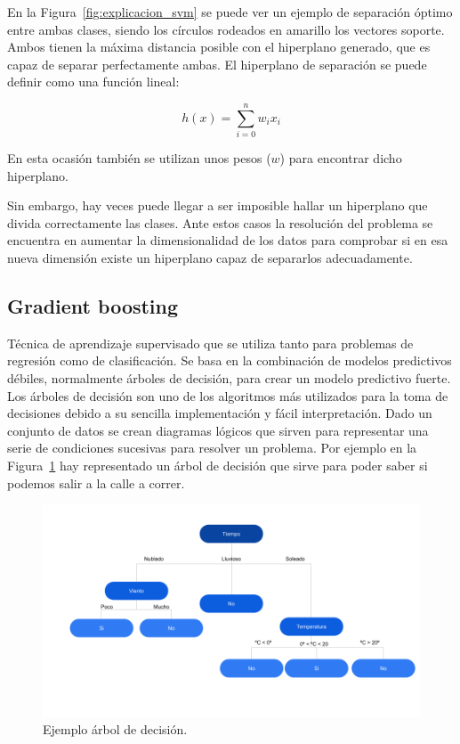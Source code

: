 \documentclass[a4paper, 12pt]{book}
\begin{document}
En la Figura~\ref{fig:explicacion_svm} se puede ver un ejemplo de separación óptimo entre ambas clases, siendo los círculos rodeados en amarillo los vectores soporte. Ambos tienen la máxima distancia posible con el hiperplano generado, que es capaz de separar perfectamente ambas. El hiperplano de separación se puede definir como una función lineal:

\begin{equation}
    h(x) = \sum_{i= 0}^{n} w_i x_i
\end{equation}

En esta ocasión también se utilizan unos pesos ($w$) para encontrar dicho hiperplano.

Sin embargo, hay veces puede llegar a ser imposible hallar un hiperplano que divida correctamente las clases. Ante estos casos la resolución del problema se encuentra en aumentar la dimensionalidad de los datos para comprobar si en esa nueva dimensión existe un hiperplano capaz de separarlos adecuadamente.


\subsection{Gradient boosting}
\label{subsec:gradient_boosting}

Técnica de aprendizaje supervisado que se utiliza tanto para problemas de regresión como de clasificación. Se basa en la combinación de modelos predictivos débiles, normalmente árboles de decisión, para crear un modelo predictivo fuerte. Los árboles de decisión son uno de los algoritmos más utilizados para la toma de decisiones debido a su sencilla implementación y fácil interpretación. Dado un conjunto de datos se crean diagramas lógicos que sirven para representar una serie de condiciones sucesivas para resolver un problema. Por ejemplo en la Figura~\ref{fig:ejemplo_adecision} hay representado un árbol de decisión que sirve para poder saber si podemos salir a la calle a correr. 

\begin{figure}[]
  \centering
  \includegraphics[width=14cm, keepaspectratio]{img/ejemplo_adecision.png}
  \caption{Ejemplo árbol de decisión.}\label{fig:ejemplo_adecision}
\end{figure}
\end{document}
